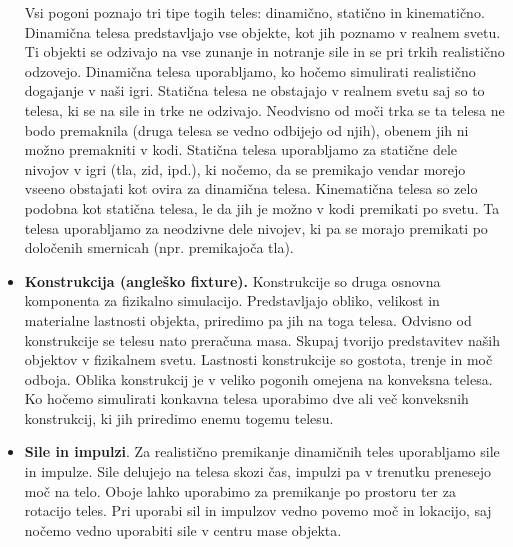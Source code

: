 \documentclass[12pt,a4paper,twoside]{book}
\begin{document}
\begin{itemize}
	Vsi pogoni poznajo tri tipe togih teles: dinamično, statično in kinematično. Dinamična telesa predstavljajo vse objekte, kot jih poznamo v realnem svetu. Ti objekti se odzivajo na vse zunanje in notranje sile in se pri trkih realistično odzovejo. Dinamična telesa uporabljamo, ko hočemo simulirati realistično dogajanje v naši igri. Statična telesa ne obstajajo v realnem svetu saj so to telesa, ki se na sile in trke ne odzivajo. Neodvisno od moči trka se ta telesa ne bodo premaknila (druga telesa se vedno odbijejo od njih), obenem jih ni možno premakniti v kodi. Statična telesa uporabljamo za statične dele nivojov v igri (tla, zid, ipd.), ki nočemo, da se premikajo vendar morejo vseeno obstajati kot ovira za dinamična telesa. Kinematična telesa so zelo podobna kot statična telesa, le da jih je možno v kodi premikati po svetu. Ta telesa uporabljamo za neodzivne dele nivojev, ki pa se morajo premikati po določenih smernicah (npr. premikajoča tla).
	\item \textbf{Konstrukcija (angleško fixture).} Konstrukcije so druga osnovna komponenta za fizikalno simulacijo. Predstavljajo obliko, velikost in materialne lastnosti objekta, priredimo pa jih na toga telesa. Odvisno od konstrukcije se telesu nato preračuna masa. Skupaj tvorijo predstavitev naših objektov v fizikalnem svetu. Lastnosti konstrukcije so gostota, trenje in moč odboja. Oblika konstrukcij je v veliko pogonih omejena na konveksna telesa. Ko hočemo simulirati konkavna telesa uporabimo dve ali več konveksnih konstrukcij, ki jih priredimo enemu togemu telesu.
	\item \textbf{Sile in impulzi}. Za realistično premikanje dinamičnih teles uporabljamo sile in impulze. Sile delujejo na telesa skozi čas, impulzi pa v trenutku prenesejo moč na telo. Oboje lahko uporabimo za premikanje po prostoru ter za rotacijo teles. Pri uporabi sil in impulzov vedno povemo moč in lokacijo, saj nočemo vedno uporabiti sile v centru mase objekta.
	

\end{itemize}
\end{document}
